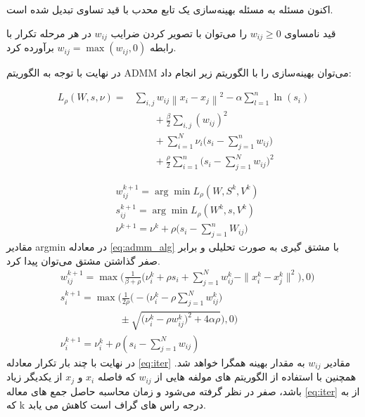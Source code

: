 \documentclass[10pt,twocolumn,a4paper]{article}
\begin{document}
اکنون مسئله به مسئله بهینه‌سازی یک تابع محدب با قید تساوی تبدیل شده است.

قید نامساوی $w_{ij} \geq 0$ را می‌توان با تصویر کردن ضرایب \( w_{ij} \)
در هر مرحله تکرار با رابطه $w_{ij} = \max(w_{ij}, 0)$ برآورده کرد.

در نهایت با توجه به الگوریتم ADMM می‌توان بهینه‌سازی را با الگوریتم زیر انجام داد:

\begin{equation}\label{eq:opt3}
	\begin{array}{cl}
		L_{\rho} (W, s, \nu) = &\sum_{i,j} w_{ij} \left\| x_i - x_j \right\|^2 - \alpha \sum_{l=1}^{n} \ln (s_i) \\
		&\qquad+ \frac{\beta}{2} \sum_{i,j} (w_{ij})^2 \\
		&\qquad+ \sum_{i=1}^{N} \nu_i \big( s_i - \sum_{j=1}^{n} w_{ij} \big)\\
		&\qquad+ \frac{\rho}{2} \sum_{i=1}^{n} \big( s_i - \sum_{j=1}^{N} w_{ij} \big)^2
	\end{array}
\end{equation}

\begin{equation}\label{eq:admm_alg}
	\begin{aligned}
		&w_{ij}^{k+1} = \arg\min L_{\rho} (W, S^k, V^k)\\
		&s_{ij}^{k+1} = \arg\min L_{\rho} (W^k, s, V^k)\\
		&\nu^{k+1} = \nu^k + \rho \big( s_i - \sum_{j=1}^{n} W_{ij} \big)
	\end{aligned}
\end{equation}
مقادیر argmin در معادله \ref{eq:admm_alg} با مشتق گیری به صورت تحلیلی و برابر صفر گذاشتن مشتق می‌توان پیدا کرد.
\begin{equation}\label{eq:iter}
	\begin{array}{cl}
		&w_{ij}^{k+1} = \max \big( \frac{1}{\beta + \rho} \big( \nu_i^k + \rho s_i + \sum_{j=1}^{N} w_{ij}^k - \|x_i^k - x_j^k\|^2 \big), 0 \big) \\
		&s_i^{k+1} = \max \big( \frac{1}{2\rho} \Big( -\big( \nu_i^k - \rho \sum_{j=1}^{N} w_{ij}^k \big) \\
		&\qquad\qquad\qquad\pm \sqrt{\big( \nu_i^k - \rho w_{ij}^k \big)^2 + 4\alpha \rho} \Big), 0 \big) \\
		&\nu_i^{k+1} = \nu_i^k + \rho \left( s_i - \sum_{j=1}^{N} w_{ij} \right)
	\end{array}
\end{equation}
در نهایت با چند بار تکرار معادله \ref{eq:iter} مقادیر $w_{ij}$ به مقدار بهینه همگرا خواهد شد. همچنین با استفاده از الگوریتم های
مولفه هایی از $w_{ij}$ که فاصله $x_i$ و $x_j$ از یکدیگر زیاد باشد، صفر در نظر گرفته می‌شود و زمان محاسبه حاصل جمع های معاله \ref{eq:iter} از
به
که k درجه راس های گراف است کاهش می یابد.
\end{document}

